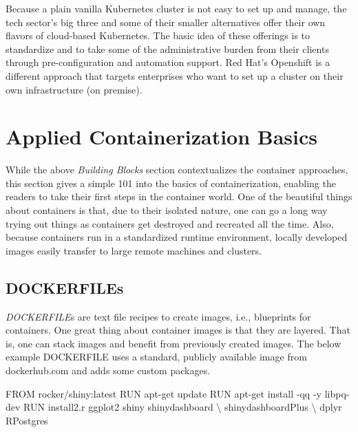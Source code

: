 \documentclass[
  12pt,
  letterpaper,
]{krantz}
\newenvironment{Shaded}{\begin{snugshade}}{\end{snugshade}}
\newcommand{\AttributeTok}[1]{\textcolor[rgb]{0.40,0.45,0.13}{#1}}
\newcommand{\DataTypeTok}[1]{\textcolor[rgb]{0.68,0.00,0.00}{#1}}
\newcommand{\ExtensionTok}[1]{\textcolor[rgb]{0.00,0.23,0.31}{#1}}
\newcommand{\NormalTok}[1]{\textcolor[rgb]{0.00,0.23,0.31}{#1}}
\begin{document}
Because a plain vanilla Kubernetes cluster is not easy to set up and
manage, the tech sector's big three and some of their smaller
alternatives offer their own flavors of cloud-based Kubernetes. The
basic idea of these offerings is to standardize and to take some of the
administrative burden from their clients through pre-configuration and
automation support. Red Hat's Openshift is a different
approach that targets enterprises who want to set up a cluster on their
own infrastructure (on premise).

\hypertarget{applied-containerization-basics}{%
\section{Applied Containerization
Basics}\label{applied-containerization-basics}}

While the above \emph{Building Blocks} section contextualizes the
container approaches, this section gives a
simple 101 into the basics of containerization,
enabling the readers to take their first steps in the container world.
One of the beautiful things about containers is that, due to their
isolated nature, one can go a long way trying out things as containers
get destroyed and recreated all the time. Also, because
containers run in a standardized runtime environment,
locally developed images easily transfer to large remote machines and
clusters.

\hypertarget{dockerfiles}{%
\subsection{DOCKERFILEs}\label{dockerfiles}}

\emph{DOCKERFILE}s are text file recipes
to create images, i.e., blueprints for containers. One great thing about
container images is that they are layered. That is, one
can stack images and benefit from previously created
images. The below example DOCKERFILE uses a standard,
publicly available image from dockerhub.com and adds some custom
packages.

\begin{Shaded}
\begin{Highlighting}[]
\ExtensionTok{FROM}\NormalTok{ rocker/shiny:latest}
\ExtensionTok{RUN}\NormalTok{ apt{-}get update}
\ExtensionTok{RUN}\NormalTok{ apt{-}get install }\AttributeTok{{-}qq} \AttributeTok{{-}y}\NormalTok{ libpq{-}dev}
\ExtensionTok{RUN}\NormalTok{ install2.r ggplot2 shiny shinydashboard  }\DataTypeTok{\textbackslash{}}
\NormalTok{               shinydashboardPlus  }\DataTypeTok{\textbackslash{}}
\NormalTok{               dplyr RPostgres  }
\end{Highlighting}
\end{Shaded}
\end{document}

